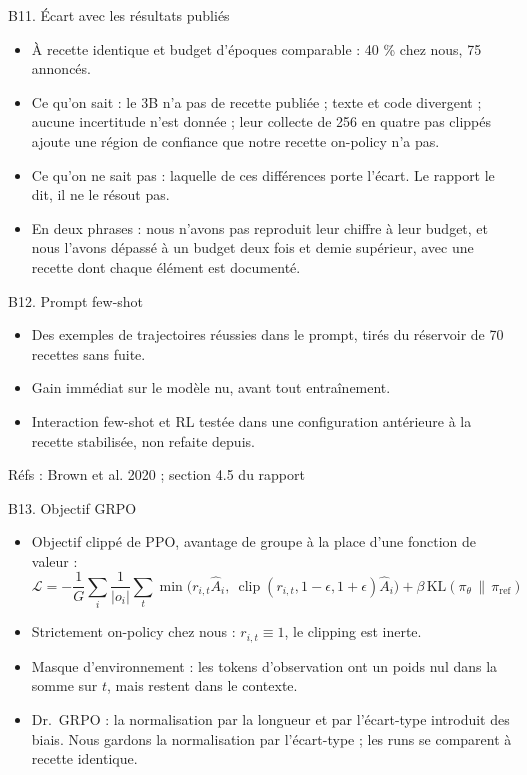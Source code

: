 \documentclass[aspectratio=169,10pt]{beamer}
\newcommand{\refs}[1]{\vfill{\tiny\textcolor{crMid}{Réfs : #1}}}
\begin{document}
\begin{frame}{B11. Écart avec les résultats publiés}
\begin{itemize}
  \item À recette identique et budget d'époques comparable : 40 \% chez nous, 75 annoncés.
  \item Ce qu'on sait : le 3B n'a pas de recette publiée ; texte et code divergent ; aucune incertitude n'est donnée ; leur collecte de 256 en quatre pas clippés ajoute une région de confiance que notre recette on-policy n'a pas.
  \item Ce qu'on ne sait pas : laquelle de ces différences porte l'écart. Le rapport le dit, il ne le résout pas.
  \item En deux phrases : nous n'avons pas reproduit leur chiffre à leur budget, et nous l'avons dépassé à un budget deux fois et demie supérieur, avec une recette dont chaque élément est documenté.
\end{itemize}
\end{frame}

\begin{frame}{B12. Prompt few-shot}
\begin{itemize}
  \item Des exemples de trajectoires réussies dans le prompt, tirés du réservoir de 70 recettes sans fuite.
  \item Gain immédiat sur le modèle nu, avant tout entraînement.
  \item Interaction few-shot et RL testée dans une configuration antérieure à la recette stabilisée, non refaite depuis.
\end{itemize}
\refs{Brown et al. 2020 ; section 4.5 du rapport}
\end{frame}

\begin{frame}{B13. Objectif GRPO}
\begin{itemize}
  \item Objectif clippé de PPO, avantage de groupe à la place d'une fonction de valeur :
  \[ \mathcal L = -\frac{1}{G}\sum_{i}\frac{1}{|o_i|}\sum_{t} \min\!\Big(r_{i,t}\hat A_i,\ \operatorname{clip}(r_{i,t},1-\epsilon,1+\epsilon)\hat A_i\Big) + \beta\, \mathrm{KL}(\pi_\theta \,\|\, \pi_{\text{ref}}) \]
  \item Strictement on-policy chez nous : $r_{i,t}\equiv 1$, le clipping est inerte.
  \item Masque d'environnement : les tokens d'observation ont un poids nul dans la somme sur $t$, mais restent dans le contexte.
  \item Dr.~GRPO : la normalisation par la longueur et par l'écart-type introduit des biais. Nous gardons la normalisation par l'écart-type ; les runs se comparent à recette identique.
\end{itemize}
\end{frame}
\end{document}
